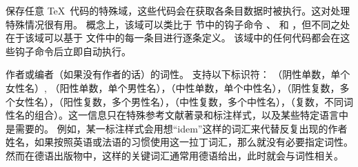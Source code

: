\begin{fieldlist}


保存任意 \TeX\ 代码的特殊域，这些代码会在获取各条目数据时被执行。这对处理特殊情况很有用。
概念上，该域可以类比于  节中的钩子命令 、 和 ，但不同之处在于该域可以基于  文件中的每一条目进行逐条定义。
该域中的任何代码都会在这些钩子命令后立即自动执行。




作者或编者（如果没有作者的话）的词性。
支持以下标识符： （阴性单数，单个女性名）, （阳性单数，单个男性名），（中性单数，单个中性名），（阴性复数，多个女性名），（阳性复数，多个男性名），（中性复数，多个中性名），（复数，不同词性名的组合）。这一信息只在特殊参考文献著录和标注样式，以及某些特定语言中是需要的。
例如，某一标注样式会用想“idem”这样的词汇来代替反复出现的作者姓名，如果按照英语或法语的习惯使用这一拉丁词汇，那么就没有必要指定词性。然而在德语出版物中，这样的关键词汇通常用德语给出，此时就会与词性相关。


\end{fieldlist}
